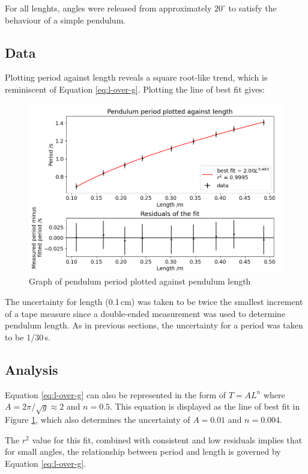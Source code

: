 \documentclass[11pt]{article}
\begin{document}
\begin{multicols}{2}
{For all lenghts, angles were released from approximately $20^\circ$ to satisfy the behaviour of a simple pendulum.

\subsection{Data}
Plotting period against length reveals a square root-like trend, which is reminiscent of Equation \ref{eq:l-over-g}. Plotting the line of best fit gives:

\begin{figure}[H]
    \centering
    \includegraphics[width=\linewidth]{../figures/period_vs_length.png}
    \caption{\centering Graph of pendulum period plotted against pendulum length}
    \label{fig:figure 6}
\end{figure}

The uncertainty for length (0.1\,cm) was taken to be twice the smallest increment of a tape measure since a double-ended measurement was used to determine pendulum length. As in previous sections, the uncertainty for a period was taken to be 1/30\,s.

\subsection{Analysis}
Equation \ref{eq:l-over-g} can also be represented in the form of $T = AL^n$ where $A = 2\pi/\sqrt{g} \approx 2$ and $n = 0.5$. This equation is displayed as the line of best fit in Figure \ref{fig:figure 6}, which also determines the uncertainty of $A = 0.01$ and $n = 0.004$.

The $r^2$ value for this fit, combined with consistent and low residuals implies that for small angles, the relationship between period and length is governed by Equation \ref{eq:l-over-g}.

}
\end{multicols}
\end{document}
